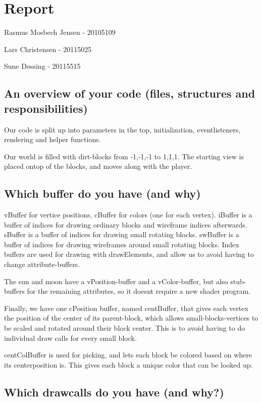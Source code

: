 \section{Report}

Rasmus Mosbech Jensen - 20105109

Lars Christensen - 20115025

Sune D\o ssing - 20115515 

\subsection{An overview of your code (files, structures and responsibilities)}

Our code is split up into parameters in the 
top, initialization, eventlisteners, rendering and helper functions.

Our world is filled with dirt-blocks from -1,-1,-1 to 1,1,1.
The starting view is placed ontop of the blocks, and moves along with the player.

\subsection{Which buffer do you have (and why)}

vBuffer for vertice positions, cBuffer for colors (one for each vertex).
iBuffer is a buffer of indices for drawing ordinary blocks and wireframe indices afterwards.
sBuffer is a buffer of indices for drawing small rotating blocks.
swBuffer is a buffer of indices for drawing wireframes around small rotating blocks.
Index buffers are used for drawing with drawElements, and allow us to avoid having to change attribute-buffers.

The sun and moon have a vPosition-buffer and a vColor-buffer, 
but also stub-buffers for the remaining attributes, so it doesnt require a new shader program.

Finally, we have one cPosition buffer, named centBuffer, 
that gives each vertex the position of the center of its parent-block, 
which allows small-blocks-vertices to be scaled and rotated around their block center.
This is to avoid having to do individual draw calls for every small block.

centColBuffer is used for picking, and lets each block be colored based on where its centerposition is.
This gives each block a unique color that can be looked up. 

\subsection{Which drawcalls do you have (and why?)}

